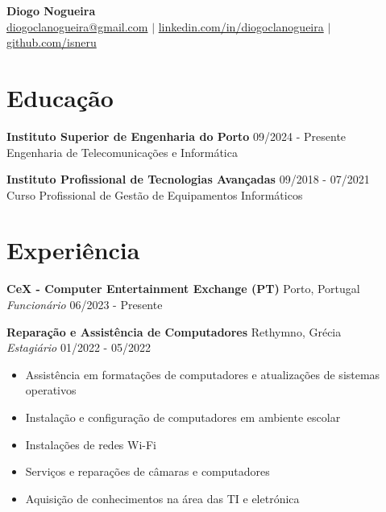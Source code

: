 \documentclass[letterpaper,10pt]{article}
\begin{document}
\begin{center}
    {\LARGE \textbf{Diogo Nogueira}}\\[4pt]
    \href{mailto:diogoclanogueira@gmail.com}{diogoclanogueira@gmail.com} \quad $|$ \quad 
    \href{https://www.linkedin.com/in/diogoclanogueira}{linkedin.com/in/diogoclanogueira} \quad $|$ \quad 
    \href{https://github.com/isneru}{github.com/isneru}
\end{center}

\vspace{0.3cm}

\section*{Educação}

\textbf{Instituto Superior de Engenharia do Porto} \hfill 09/2024 - Presente \\
Engenharia de Telecomunicações e Informática

\textbf{Instituto Profissional de Tecnologias Avançadas} \hfill 09/2018 - 07/2021 \\
Curso Profissional de Gestão de Equipamentos Informáticos

\section*{Experiência}

\textbf{CeX - Computer Entertainment Exchange (PT)} \hfill Porto, Portugal \\
\textit{Funcionário} \hfill 06/2023 - Presente

\bigskip

\textbf{Reparação e Assistência de Computadores} \hfill Rethymno, Grécia \\
\textit{Estagiário} \hfill 01/2022 - 05/2022
\begin{itemize}[leftmargin=0.2in]
  \item Assistência em formatações de computadores e atualizações de sistemas operativos
  \item Instalação e configuração de computadores em ambiente escolar
  \item Instalações de redes Wi-Fi
  \item Serviços e reparações de câmaras e computadores
  \item Aquisição de conhecimentos na área das TI e eletrónica
\end{itemize}

\bigskip
\end{document}
